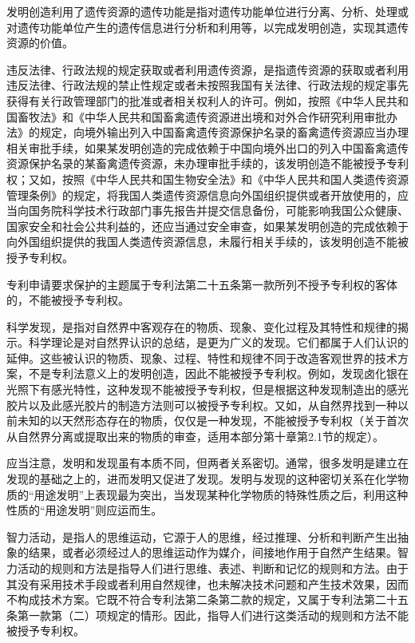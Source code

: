 发明创造利用了遗传资源的遗传功能是指对遗传功能单位进行分离、分析、处理或对遗传功能单位产生的遗传信息进行分析和利用等，以完成发明创造，实现其遗传资源的价值。

违反法律、行政法规的规定获取或者利用遗传资源，是指遗传资源的获取或者利用违反法律、行政法规的禁止性规定或者未按照我国有关法律、行政法规的规定事先获得有关行政管理部门的批准或者相关权利人的许可。例如，按照《中华人民共和国畜牧法》和《中华人民共和国畜禽遗传资源进出境和对外合作研究利用审批办法》的规定，向境外输出列入中国畜禽遗传资源保护名录的畜禽遗传资源应当办理相关审批手续，如果某发明创造的完成依赖于中国向境外出口的列入中国畜禽遗传资源保护名录的某畜禽遗传资源，未办理审批手续的，该发明创造不能被授予专利权；又如，按照《中华人民共和国生物安全法》和《中华人民共和国人类遗传资源管理条例》的规定，将我国人类遗传资源信息向外国组织提供或者开放使用的，应当向国务院科学技术行政部门事先报告并提交信息备份，可能影响我国公众健康、国家安全和社会公共利益的，还应当通过安全审查，如果某发明创造的完成依赖于向外国组织提供的我国人类遗传资源信息，未履行相关手续的，该发明创造不能被授予专利权。

专利申请要求保护的主题属于专利法第二十五条第一款所列不授予专利权的客体的，不能被授予专利权。

科学发现，是指对自然界中客观存在的物质、现象、变化过程及其特性和规律的揭示。科学理论是对自然界认识的总结，是更为广义的发现。它们都属于人们认识的延伸。这些被认识的物质、现象、过程、特性和规律不同于改造客观世界的技术方案，不是专利法意义上的发明创造，因此不能被授予专利权。例如，发现卤化银在光照下有感光特性，这种发现不能被授予专利权，但是根据这种发现制造出的感光胶片以及此感光胶片的制造方法则可以被授予专利权。又如，从自然界找到一种以前未知的以天然形态存在的物质，仅仅是一种发现，不能被授予专利权（关于首次从自然界分离或提取出来的物质的审查，适用本部分第十章第2.1节的规定）。

应当注意，发明和发现虽有本质不同，但两者关系密切。通常，很多发明是建立在发现的基础之上的，进而发明又促进了发现。发明与发现的这种密切关系在化学物质的“用途发明”上表现最为突出，当发现某种化学物质的特殊性质之后，利用这种性质的“用途发明”则应运而生。

智力活动，是指人的思维运动，它源于人的思维，经过推理、分析和判断产生出抽象的结果，或者必须经过人的思维运动作为媒介，间接地作用于自然产生结果。智力活动的规则和方法是指导人们进行思维、表述、判断和记忆的规则和方法。由于其没有采用技术手段或者利用自然规律，也未解决技术问题和产生技术效果，因而不构成技术方案。它既不符合专利法第二条第二款的规定，又属于专利法第二十五条第一款第（二）项规定的情形。因此，指导人们进行这类活动的规则和方法不能被授予专利权。

